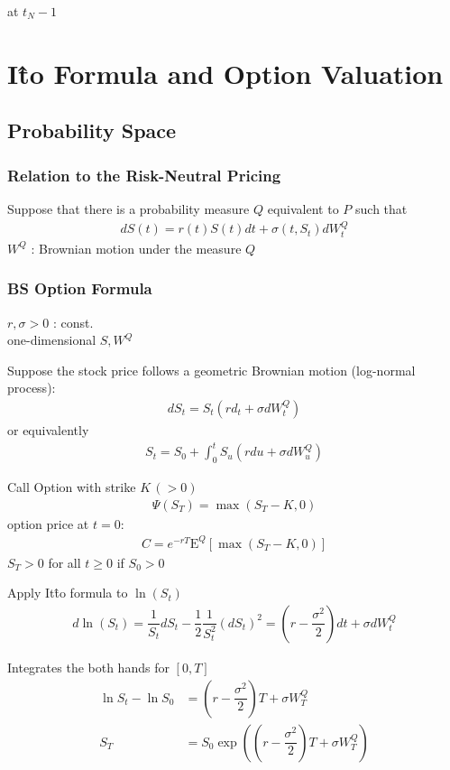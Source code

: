 \documentclass[a4paper,11pt]{jsarticle}
\theoremstyle{definition}
\newcommand{\df}[2]{\dfrac{#1}{#2}}
\begin{document}
at $t_N-1$



\newpage
\section{I\^{t}o Formula and Option Valuation}
\subsection{Probability Space}


\subsubsection{Relation to the Risk-Neutral Pricing}
Suppose that there is a probability measure $Q$
equivalent to $P$ such that
\begin{align}
  dS(t)=r(t)S(t)dt+\sigma(t,S_t)dW_t^Q
\end{align}
$W^Q$ : Brownian motion under the measure $Q$


\subsubsection{BS Option Formula}
$r, \sigma >0$ : const. \\
one-dimensional $S, W^Q$

Suppose the stock price follows a geometric Brownian motion
(log-normal process):
\begin{align}
  dS_t=S_t(rd_t+\sigma dW_t^Q)
\end{align}
or equivalently
\begin{align}
  S_t = S_0 +\int_0^t S_u(rdu+\sigma dW_u^Q)
\end{align}

Call Option with strike $K \,(>0)$
\begin{align}
  \Psi(S_T)=\max(S_T-K,0)
\end{align}
option price at $t=0$:
\begin{align}
  C=e^{-rT}\mathrm{E}^Q[\max(S_T-K,0)]
\end{align}
$S_T>0$ for all $t\geq 0$ if $S_0>0$

Apply It\^{t}o formula to $\ln (S_t)$
\begin{align}
  d\ln(S_t)=\df{1}{S_t}dS_t-\df{1}{2}\df{1}{S_t^2}(dS_t)^2
  =\left(r-\df{\sigma^2}{2} \right)dt+\sigma dW_t^Q
\end{align}

Integrates the both hands for $[0,T]$
\begin{align}
  \ln S_t -\ln S_0
  &=\left(r-\df{\sigma^2}{2} \right)T+\sigma W_T^Q \\
  S_T&=S_0 \exp\left(
  \left(r-\df{\sigma^2}{2} \right)T+\sigma W_T^Q\right)
\end{align}
\end{document}
